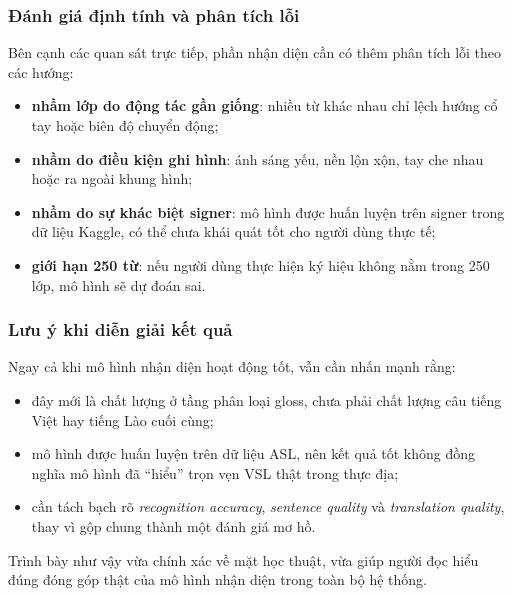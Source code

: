 \subsubsection{Đánh giá định tính và phân tích lỗi}

Bên cạnh các quan sát trực tiếp, phần nhận diện cần có thêm phân tích lỗi theo các hướng:
\begin{itemize}
    \item \textbf{nhầm lớp do động tác gần giống}: nhiều từ khác nhau chỉ lệch hướng cổ tay hoặc biên
    độ chuyển động;
    \item \textbf{nhầm do điều kiện ghi hình}: ánh sáng yếu, nền lộn xộn, tay che nhau hoặc ra ngoài
    khung hình;
    \item \textbf{nhầm do sự khác biệt signer}: mô hình được huấn luyện trên signer trong dữ liệu
    Kaggle, có thể chưa khái quát tốt cho người dùng thực tế;
    \item \textbf{giới hạn 250 từ}: nếu người dùng thực hiện ký hiệu không nằm trong 250 lớp,
    mô hình sẽ dự đoán sai.
\end{itemize}

\subsubsection{Lưu ý khi diễn giải kết quả}

Ngay cả khi mô hình nhận diện hoạt động tốt, vẫn cần nhấn mạnh rằng:
\begin{itemize}
    \item đây mới là chất lượng ở tầng phân loại gloss, chưa phải chất lượng câu tiếng Việt hay tiếng
    Lào cuối cùng;
    \item mô hình được huấn luyện trên dữ liệu ASL, nên kết quả tốt không đồng nghĩa mô hình
    đã ``hiểu'' trọn vẹn VSL thật trong thực địa;
    \item cần tách bạch rõ \textit{recognition accuracy}, \textit{sentence quality}
    và \textit{translation quality}, thay vì gộp chung thành một đánh giá mơ hồ.
\end{itemize}

Trình bày như vậy vừa chính xác về mặt học thuật, vừa giúp người đọc hiểu đúng đóng góp thật của mô
hình nhận diện trong toàn bộ hệ thống.

